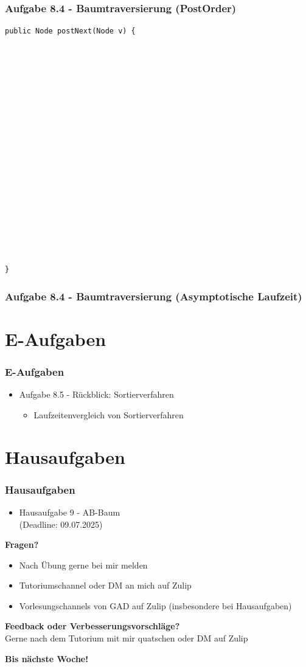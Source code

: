 \documentclass{beamer}
\begin{document}
\begin{frame}[fragile]
	\frametitle{Aufgabe 8.4 - Baumtraversierung (PostOrder)}
	\scriptsize
	\begin{verbatim}
public Node postNext(Node v) {



















}
	\end{verbatim}
\end{frame}

\begin{frame}[t]
	\frametitle{Aufgabe 8.4 - Baumtraversierung (Asymptotische Laufzeit)}
\end{frame}

\section{E-Aufgaben}
\begin{frame}
	\frametitle{E-Aufgaben}
	\begin{itemize}
		\item Aufgabe 8.5 - Rückblick: Sortierverfahren \\
		      \begin{itemize}
			      \item Laufzeitenvergleich von Sortierverfahren
		      \end{itemize}
	\end{itemize}
\end{frame}

\section{Hausaufgaben}
\begin{frame}
	\frametitle{Hausaufgaben}
	\begin{itemize}
		\item Hausaufgabe 9 - AB-Baum \\
		      (Deadline: 09.07.2025)
	\end{itemize}
\end{frame}

\begin{frame}
	\textbf{Fragen?}
	\begin{itemize}
		\item Nach Übung gerne bei mir melden
		\item Tutoriumschannel oder DM an mich auf Zulip
		\item Vorlesungschannels von GAD auf Zulip (insbesondere bei Hausaufgaben)
	\end{itemize}

	\medskip
	\textbf{Feedback oder Verbesserungsvorschläge?} \\
	Gerne nach dem Tutorium mit mir quatschen oder DM auf Zulip

	\medskip
	\textbf{Bis nächste Woche!}
\end{frame}

\end{document}
